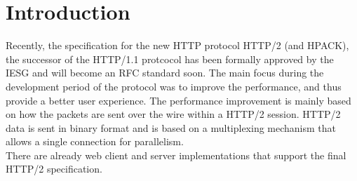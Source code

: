 \section{Introduction}
\label{chap:intro}
Recently, the specification for the new HTTP protocol HTTP/2 (and HPACK), the successor of the HTTP/1.1 protcocol has been formally approved by the IESG and will become an RFC standard soon. The main focus during the development period of the protocol was to improve the performance, and thus provide a better user experience. The performance improvement is mainly based on how the packets are sent over the wire within a HTTP/2 session. HTTP/2 data is sent in binary format and is based on a multiplexing mechanism that allows a single connection for parallelism.  \\
There are already web client and server implementations that support the final HTTP/2 specification.
